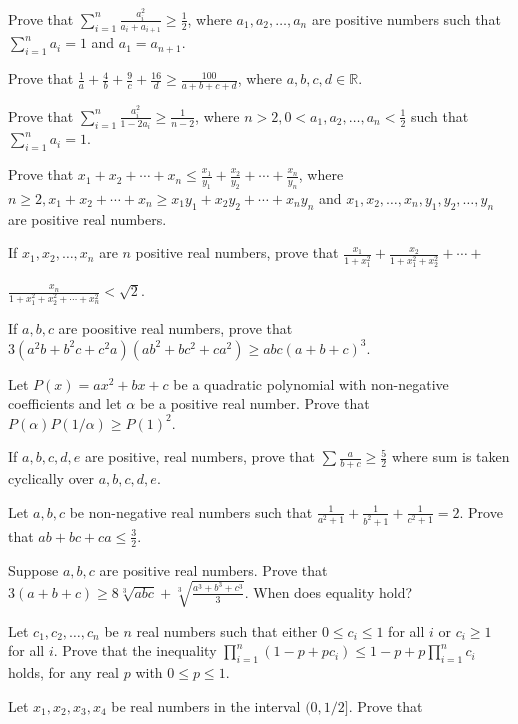 \item Prove that $\displaystyle\sum_{i=1}^n\frac{a_i^2}{a_i + a_{i + 1}}\geq \frac{1}{2}$, where $a_1, a_2, \ldots, a_n$ are
  positive numbers such that $\displaystyle\sum_{i=1}^na_i = 1$ and $a_1 = a_{n + 1}$.
\item Prove that $\frac{1}{a} + \frac{4}{b} + \frac{9}{c} + \frac{16}{d}\geq \frac{100}{a + b + c + d}$, where $a, b, c,
  d\in\mathbb{R}$.
\item Prove that $\displaystyle\sum_{i=1}^n\frac{a_i^2}{1 - 2a_i}\geq \frac{1}{n - 2}$, where $n > 2, 0 < a_1, a_2, \ldots, a_n <
  \frac{1}{2}$ such that $\displaystyle\sum_{i=1}^na_i = 1$.
\item Prove that $x_1 + x_2 + \cdots + x_n\leq \frac{x_1}{y_1} + \frac{x_2}{y_2} + \cdots + \frac{x_n}{y_n}$, where $n\geq 2, x_1 +
  x_2 + \cdots + x_n\geq x_1y_1 + x_2y_2 + \cdots + x_ny_n$ and $x_1, x_2, \ldots, x_n, y_1, y_2, \ldots, y_n$ are positive real
  numbers.
\item If $x_1, x_2, \ldots, x_n$ are $n$ positive real numbers, prove that $\frac{x_1}{1 + x_1^2} + \frac{x_2}{1 + x_1^2 + x_2^2} +
  \cdots +$

  $\frac{x_n}{1 + x_1^2 + x_2^2 + \cdots + x_n^2} < \sqrt{2}$.
\item If $a, b, c$ are poositive real numbers, prove that $3(a^2b + b^2c + c^2a)(ab^2 + bc^2 + ca^2)\geq abc(a + b + c)^3$.
\item Let $P(x) = ax^2 + bx + c$ be a quadratic polynomial with non-negative coefficients and let $\alpha$ be a positive real
  number. Prove that $P(\alpha)P(1/\alpha)\geq P(1)^2$.
\item If $a, b, c, d, e$ are positive, real numbers, prove that $\displaystyle\sum\frac{a}{b + c}\geq \frac{5}{2}$ where sum is
  taken cyclically over $a, b, c, d, e$.
\item Let $a, b, c$ be non-negative real numbers such that $\frac{1}{a^2 + 1} + \frac{1}{b^2 + 1} + \frac{1}{c^2 + 1} = 2$. Prove
  that $ab + bc + ca\leq \frac{3}{2}$.
\item Suppose $a, b, c$ are positive real numbers. Prove that $3(a + b + c)\geq 8\sqrt[3]{abc} + \sqrt[3]{\frac{a^3 + b^3 +
    c^3}{3}}$. When does equality hold?
\item Let $c_1, c_2, \ldots, c_n$ be $n$ real numbers such that either $0\leq c_i\leq 1$ for all $i$ or $c_i\geq 1$ for all
  $i$. Prove that the inequality $\displaystyle\prod_{i=1}^n(1 - p +pc_i)\leq 1 - p + p\prod_{i=1}^nc_i$ holds, for any real $p$
  with $0\leq p\leq 1$.
\item Let $x_1, x_2, x_3, x_4$ be real numbers in the interval $(0, 1/2]$. Prove that

